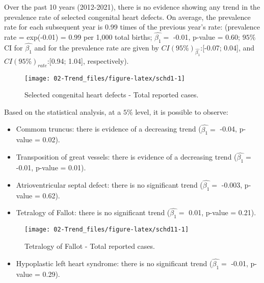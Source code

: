 \documentclass[
]{krantz}
\providecommand{\tightlist}{%
  \setlength{\itemsep}{0pt}\setlength{\parskip}{0pt}}
\begin{document}
Over the past 10 years (2012-2021), there is no evidence showing any trend in the prevalence rate of selected congenital heart defects. On average, the prevalence rate for each subsequent year is 0.99 times of the previous year's rate: (prevalence rate = exp(-0.01) = 0.99 per 1,000 total births; \(\hat{\beta_{1}} =\) -0.01, p-value = 0.60; \(95\%\) CI for \(\hat{\beta_{1}}\) and for the prevalence rate are given by \(CI(95\%)_{\hat{\beta_{1}}}\):{[}-0.07; 0.04{]}, and \(CI(95\%)_{rate}\):{[}0.94; 1.04{]}, respectively).

\begin{figure}[h]

{\centering \texttt{[image: 02-Trend\_files/figure-latex/schd1-1]} 

}

\caption{Selected congenital heart defects - Total reported cases.}\label{fig:schd1}
\end{figure}

Based on the statistical analysis, at a \(5\%\) level, it is possible to observe:

\begin{itemize}
\item
  Commom truncus: there is evidence of a decreasing trend (\(\hat{\beta_{1}} =\) -0.04, p-value = 0.02).
\item
  Transposition of great vessels: there is evidence of a decreasing trend (\(\hat{\beta_{1}} =\) -0.01, p-value = 0.01).
\item
  Atrioventricular septal defect: there is no significant trend (\(\hat{\beta_{1}} =\) -0.003, p-value = 0.62).
\item
  Tetralogy of Fallot: there is no significant trend (\(\hat{\beta_{1}} =\) 0.01, p-value = 0.21).
\end{itemize}

\begin{figure}[h]

{\centering \texttt{[image: 02-Trend\_files/figure-latex/schd11-1]} 

}

\caption{Tetralogy of Fallot - Total reported cases.}\label{fig:schd11}
\end{figure}

\begin{itemize}
\tightlist
\item
  Hypoplastic left heart syndrome: there is no significant trend (\(\hat{\beta_{1}} =\) -0.01, p-value = 0.29).
\end{itemize}
\end{document}

